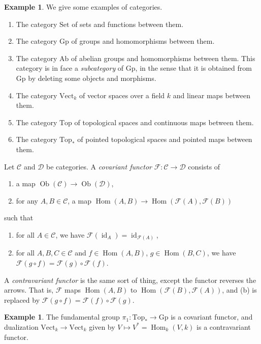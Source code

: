 \documentclass{book}
\newcommand{\scrC}{\mathscr{C}}
\newcommand{\scrD}{\mathscr{D}}
\newcommand{\scrF}{\mathscr{F}}
\DeclareMathOperator{\id}{id}
\DeclareMathOperator{\Ob}{Ob}
\DeclareMathOperator{\Hom}{Hom}
\theoremstyle{definition}
\newtheorem{example}[theorem]{Example}
\theoremstyle{remark}
\numberwithin{equation}{section}
\begin{document}
\begin{example}
    We give some examples of categories.
    \begin{enumerate}[label=(\arabic*)]
        \item The category $\mathrm{Set}$ of sets and functions between them.
        \item The category $\mathrm{Gp}$ of groups and homomorphisms between them.
        \item The category $\mathrm{Ab}$ of abelian groups and homomorphisms between them. This category is in face a \textit{subcategory} of $\mathrm{Gp}$, in the sense that it is obtained from $\mathrm{Gp}$ by deleting some objects and morphisms.
        \item The category $\mathrm{Vect}_k$ of vector spaces over a field $k$ and linear maps between them.
        \item The category $\mathrm{Top}$ of topological spaces and continuous maps between them.
        \item The category $\mathrm{Top_*}$ of pointed topological spaces and pointed maps between them.
    \end{enumerate}
\end{example}

Let $\scrC$ and $\scrD$ be categories. A \textit{covariant functor} $\scrF \colon \scrC \to \scrD$ consists of 
\begin{enumerate}[label=(\arabic*)]
    \item a map $\Ob(\scrC) \to \Ob(\scrD)$,
    \item for any $A,B \in \scrC$, a map $\Hom(A,B) \to \Hom(\scrF(A),\scrF(B))$
\end{enumerate}
such that 
\begin{enumerate}[label=(\alph*)]
    \item for all $A \in \scrC$, we have $\scrF(\id_A) = \id_{\scrF(A)}$,
    \item for all $A,B,C \in \scrC$ and $f \in \Hom(A,B)$, $g \in \Hom(B,C)$, we have $\scrF(g \circ f) = \scrF(g) \circ \scrF(f)$.
\end{enumerate}
A \textit{contravariant functor} is the same sort of thing, except the functor reverses the arrows. That is, $\scrF$ maps $\Hom(A,B)$ to $\Hom(\scrF(B),\scrF(A))$, and (b) is replaced by $\scrF(g \circ f) = \scrF(f) \circ \scrF(g)$.
\begin{example}
    The fundamental group $\pi_1 \colon \mathrm{Top}_* \to \mathrm{Gp}$ is a covariant functor, and dualization $\mathrm{Vect}_k \to \mathrm{Vect}_k$ given by $V \mapsto V^* = \Hom_k(V,k)$ is a contravariant functor.
\end{example}
\end{document}
